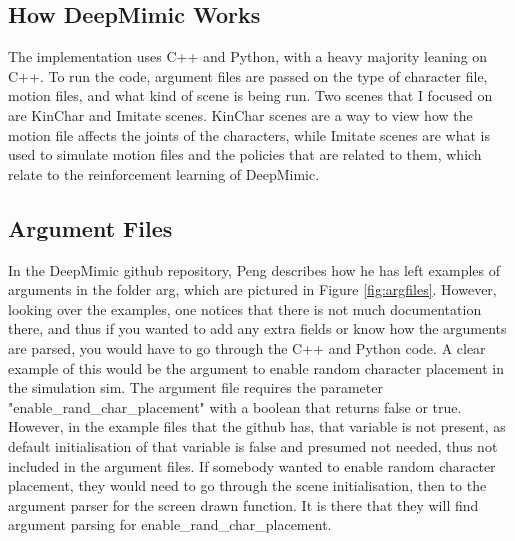 \documentclass{l4proj}
\begin{document}
\subsection{How DeepMimic Works}
The implementation uses C++ and Python, with a heavy majority leaning on C++. To run the code, argument files are passed on the type of character file, motion files, and what kind of scene is being run. Two scenes that I focused on are KinChar and Imitate scenes. KinChar scenes are a way to view how the motion file affects the joints of the characters, while Imitate scenes are what is used to simulate motion files and the policies that are related to them, which relate to the reinforcement learning of DeepMimic.

\subsection{Argument Files}
In the DeepMimic github repository, Peng describes how he has left examples of arguments in the folder \/arg, which are pictured in Figure \ref{fig:argfiles}. However, looking over the examples, one notices that there is not much documentation there, and thus if you wanted to add any extra fields or know how the arguments are parsed, you would have to go through the C++ and Python code. A clear example of this would be the argument to enable random character placement in the simulation sim. The argument file requires the parameter "enable\_rand\_char\_placement" with a boolean that returns false or true. However, in the example files that the github has, that variable is not present, as default initialisation of that variable is false and presumed not needed, thus not included in the argument files. If somebody wanted to enable random character placement, they would need to go through the scene initialisation, then to the argument parser for the screen drawn function. It is there that they will find argument parsing for enable\_rand\_char\_placement.
\end{document}
